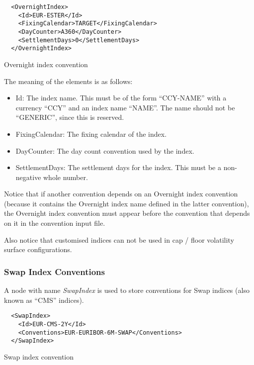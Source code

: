 \begin{listing}[H]
\begin{verbatim}
  <OvernightIndex>
    <Id>EUR-ESTER</Id>
    <FixingCalendar>TARGET</FixingCalendar>
    <DayCounter>A360</DayCounter>
    <SettlementDays>0</SettlementDays>
  </OvernightIndex>
\end{verbatim}
\caption{Overnight index convention}
\label{lst:overnight_index_conventions}
\end{listing}

The meaning of the elements is as follows:

\begin{itemize}
\item Id: The index name. This must be of the form ``CCY-NAME'' with a currency ``CCY'' and an index name ``NAME''. The
  name should not be ``GENERIC'', since this is reserved.
\item FixingCalendar: The fixing calendar of the index.
\item DayCounter: The day count convention used by the index.
\item SettlementDays: The settlement days for the index. This must be a non-negative whole number.
\end{itemize}

Notice that if another convention depends on an Overnight index convention (because it contains the Overnight index name
defined in the latter convention), the Overnight index convention must appear before the convention that depends on it
in the convention input file.

Also notice that customised indices can not be used in cap / floor volatility surface configurations.

\subsubsection{Swap Index Conventions}

A node with name \emph{SwapIndex} is used to store conventions for Swap indices (also known as ``CMS'' indices).

\begin{listing}[H]
\begin{verbatim}
  <SwapIndex>
    <Id>EUR-CMS-2Y</Id>
    <Conventions>EUR-EURIBOR-6M-SWAP</Conventions>
  </SwapIndex>
\end{verbatim}
\caption{Swap index convention}
\label{lst:swap_index_conventions}
\end{listing}

